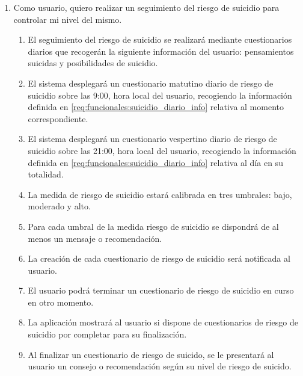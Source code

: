        \begin{enumerate}[resume=req-usuario,label=\textbf{\texttt{RU-\arabic*}}]
            \item \label{req:usuario:seguimiento_suicidio}  Como usuario, quiero realizar un seguimiento del riesgo de suicidio para controlar mi nivel del mismo.
            \begin{enumerate}[resume=req-funcionales,label=\textbf{\texttt{RF-\arabic*}}]
                \item \label{req:funcionales:suicidio_diario_info} El seguimiento del riesgo de suicidio se realizará mediante cuestionarios diarios que recogerán la siguiente información del usuario: pensamientos suicidas y posibilidades de suicidio.
                \item \label{req:funcionales:suicidio_diario_manana} El sistema desplegará un cuestionario matutino diario de riesgo de suicidio sobre las 9:00, hora local del usuario, recogiendo la información definida en \ref{req:funcionales:suicidio_diario_info} relativa al momento correspondiente.
                \item \label{req:funcionales:suicidio_diario_noche}  El sistema desplegará un cuestionario vespertino diario de riesgo de suicidio sobre las 21:00, hora local del usuario, recogiendo la información definida en \ref{req:funcionales:suicidio_diario_info} relativa al día en su totalidad.
                \item \label{req:funcionales:suicidio_umbrales} La medida de riesgo de suicidio estará calibrada en tres umbrales: bajo, moderado y alto.
                \item \label{req:funcionales:suicidio_consejo} Para cada umbral de la medida riesgo de suicidio se dispondrá de al menos un mensaje o recomendación.
                \item \label{req:funcionales:suicidio_notificacion} La creación de cada cuestionario de riesgo de suicidio será notificada al usuario.
                \item \label{req:funcionales:suicidio_cuestionario_aplazar} El usuario podrá terminar un cuestionario de riesgo de suicidio en curso en otro momento.
                \item \label{req:funcionales:suicidio_cuestionario_pendientes} La aplicación mostrará al usuario si dispone de cuestionarios de riesgo de suicidio por completar para su finalización.
                \item \label{req:funcionales:suicidio_cuestionario_consejo} Al finalizar un cuestionario de riesgo de suicido, se le presentará al usuario un consejo o recomendación según su nivel de riesgo de suicido.
            \end{enumerate}
        \end{enumerate}
